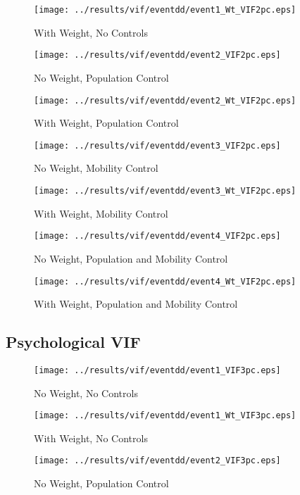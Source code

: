 \documentclass[11pt,letterpaper]{article}
\begin{document}
\begin{figure}[H]
\caption{With Weight, No Controls}
\centering
\texttt{[image: ../results/vif/eventdd/event1\_Wt\_VIF2pc.eps]}
\end{figure}
\begin{figure}[H]
\caption{No Weight, Population Control}
\centering
\texttt{[image: ../results/vif/eventdd/event2\_VIF2pc.eps]}
\end{figure}

\begin{figure}[H]
\caption{With Weight, Population Control}
\centering
\texttt{[image: ../results/vif/eventdd/event2\_Wt\_VIF2pc.eps]}
\end{figure}
\begin{figure}[H]
\caption{No Weight, Mobility Control}
\centering
\texttt{[image: ../results/vif/eventdd/event3\_VIF2pc.eps]}
\end{figure}

\begin{figure}[H]
\caption{With Weight, Mobility Control}
\centering
\texttt{[image: ../results/vif/eventdd/event3\_Wt\_VIF2pc.eps]}
\end{figure}
\begin{figure}[H]
\caption{No Weight, Population and Mobility Control}
\centering
\texttt{[image: ../results/vif/eventdd/event4\_VIF2pc.eps]}
\end{figure}

\begin{figure}[H]
\caption{With Weight, Population and Mobility Control}
\centering
\texttt{[image: ../results/vif/eventdd/event4\_Wt\_VIF2pc.eps]}
\end{figure}

	\subsection{Psychological VIF}
\begin{figure}[H]
\caption{No Weight, No Controls}
\centering
\texttt{[image: ../results/vif/eventdd/event1\_VIF3pc.eps]}
\end{figure}

\begin{figure}[H]
\caption{With Weight, No Controls}
\centering
\texttt{[image: ../results/vif/eventdd/event1\_Wt\_VIF3pc.eps]}
\end{figure}
\begin{figure}[H]
\caption{No Weight, Population Control}
\centering
\texttt{[image: ../results/vif/eventdd/event2\_VIF3pc.eps]}
\end{figure}
\end{document}
